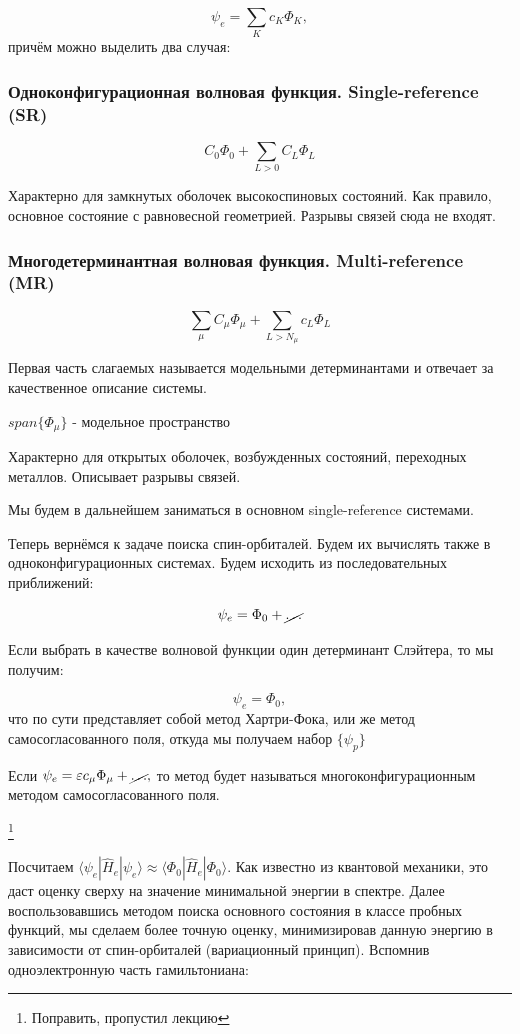 \documentclass[12pt, oneside]{article}
\numberwithin{equation}{section}  %
\begin{document}
\[\psi_e = \sum_K c_K \Phi_K,\]
причём можно выделить два случая:

\begin{multicols}{2}
\subsubsection*{Одноконфигурационная волновая функция. Single-reference (SR)}

\[C_0 \Phi_0 + \sum_{L > 0} C_L \Phi_L\]

Характерно для замкнутых оболочек высокоспиновых состояний. Как правило, основное состояние с равновесной геометрией. Разрывы связей сюда не входят.

\columnbreak

\subsubsection*{Многодетерминантная волновая функция. Multi-reference (MR)}
\[\sum_\mu C_\mu \Phi_\mu + \sum_{L > N_\mu } c_L \Phi_L\] 


Первая часть слагаемых называется модельными детерминантами и отвечает за качественное описание системы. 

\(span\{\Phi_\mu\}\) - модельное пространство

Характерно для открытых оболочек, возбужденных состояний, переходных металлов. Описывает разрывы связей.
\end{multicols}

Мы будем в дальнейшем заниматься в основном single-reference системами.

{\color{red}Теперь вернёмся к задаче поиска спин-орбиталей. Будем их вычислять также в одноконфигурационных системах. Будем исходить из последовательных приближений:

\[\psi_e = \Phi_0 + \cancel{\dots}\]

Если выбрать в качестве волновой функции один детерминант Слэйтера, то мы получим:

\[\psi_e = \Phi_0,\]
что по сути представляет собой метод Хартри-Фока, или же метод самосогласованного поля, откуда мы получаем набор \(\{\psi_p\}\)

Если \(\psi_e = \varepsilon c_\mu \Phi_\mu + \cancel{\dots},\)
то метод будет называться многоконфигурационным методом самосогласованного поля.}\footnote{Поправить, пропустил лекцию}

Посчитаем \(\langle \psi_e | \hat{H}_e | \psi_e \rangle \approx \langle \Phi_0 | \hat{H}_e | \Phi_0 \rangle\). Как известно из квантовой механики, это даст оценку сверху на значение минимальной энергии в спектре. Далее воспользовавшись методом поиска основного состояния в классе пробных функций, мы сделаем более точную оценку, минимизировав данную энергию в зависимости от спин-орбиталей (вариационный принцип). Вспомнив одноэлектронную часть гамильтониана:
\end{document}

